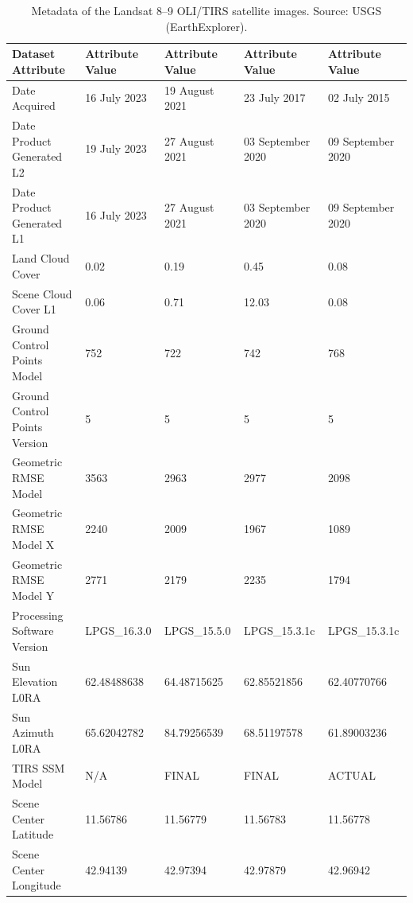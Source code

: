 \documentclass[jimaging,article,accept,pdftex,moreauthors]{Definitions/mdpi}
\begin{document}
\begin{table}[H]
\caption{{Metadata%
} of the Landsat 8--9 OLI/TIRS satellite images{. }Source: USGS (EarthExplorer).}
\label{tab02}
    \centering
\footnotesize 
    \begin{tabular}{ l  l  l  l  l }
 \toprule
        \textbf{Dataset Attribute} & \textbf{Attribute Value} & \textbf{Attribute Value} & \textbf{Attribute Value} & \textbf{Attribute Value} \\ \midrule
        Date Acquired & 16 July 2023 %
 & 19 August 2021 & 23 July 2017 & 02 July 2015 \\ \midrule
        Date Product Generated L2 & 19 July 2023 & 27 August 2021 & 03 September 2020 & 09 September 2020 \\ \midrule
        Date Product Generated L1 & 16 July 2023 & 27 August 2021 & 03 September 2020 & 09 September 2020 \\ \midrule
        Land Cloud Cover & 0.02 & 0.19 & 0.45 & 0.08 \\ \midrule
        Scene Cloud Cover L1 & 0.06 & 0.71 & 12.03 & 0.08 \\ \midrule
        Ground Control Points Model & 752 & 722 & 742 & 768 \\ \midrule
        Ground Control Points Version & 5 & 5 & 5 & 5 \\ \midrule
        Geometric RMSE Model & 3563 & 2963 & 2977 & 2098 \\ \midrule
        Geometric RMSE Model X & 2240 & 2009 & 1967 & 1089 \\ \midrule
        Geometric RMSE Model Y & 2771 & 2179 & 2235 & 1794 \\ \midrule
        Processing Software Version & LPGS\_16.3.0 & LPGS\_15.5.0 & LPGS\_15.3.1c & LPGS\_15.3.1c \\ \midrule
        Sun Elevation L0RA & 62.48488638 & 64.48715625 & 62.85521856 & 62.40770766 \\ \midrule
        Sun Azimuth L0RA & 65.62042782 & 84.79256539 & 68.51197578 & 61.89003236 \\ \midrule
        TIRS SSM Model & N/A & FINAL & FINAL & ACTUAL \\ \midrule
        Scene Center Latitude & 11.56786 & 11.56779 & 11.56783 & 11.56778 \\ \midrule
        Scene Center Longitude & 42.94139 & 42.97394 & 42.97879 & 42.96942 \\ \midrule

\end{tabular}
\end{table}
\end{document}
